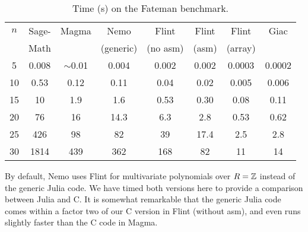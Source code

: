 \documentclass{sig-alternate-05-2015}
\begin{document}
\begin{table}
\center
\caption{Time (s) on the Fateman benchmark.}
\begin{small}
\setlength{\tabcolsep}{2.0pt}
\renewcommand{\arraystretch}{1.08}
\begin{tabular}{c c c c c c c c} \hline
$n$ & Sage- & Magma & Nemo & Flint & Flint & Flint & Giac \\ 
    &   Math    &       & (generic) & (no asm) & (asm) & (array) & \\ \hline
     5  &  0.008 & $\sim$0.01   & 0.004      &        0.002    &        0.002       &      0.0003    &    0.0002 \\
    10  &  0.53  &   0.12  &   0.11     &         0.04    &         0.02       &         0.005   &      0.006 \\
    15  &   10   &    1.9  &      1.6   &         0.53    &          0.30      &           0.08   &         0.11 \\
    20  &   76   &    16   &    14.3    &          6.3    &            2.8     &            0.53   &         0.62 \\
    25  &  426   &   98    &      82    &          39     &         17.4        &           2.5     &         2.8 \\
    30  & 1814   & 439     &  362       &         168     &            82        &            11     &          14 \\
\end{tabular}
\label{tab:fateman}
\end{small}
\end{table}

By default, Nemo uses Flint for multivariate polynomials
over $R = \mathbb{Z}$ instead of the generic
Julia code.
We have timed both versions here
to provide a comparison between Julia and C.
It is somewhat remarkable that the generic Julia code comes
within a factor two of our C version in Flint (without asm),
and even runs slightly faster than the C code in Magma.
\end{document}
